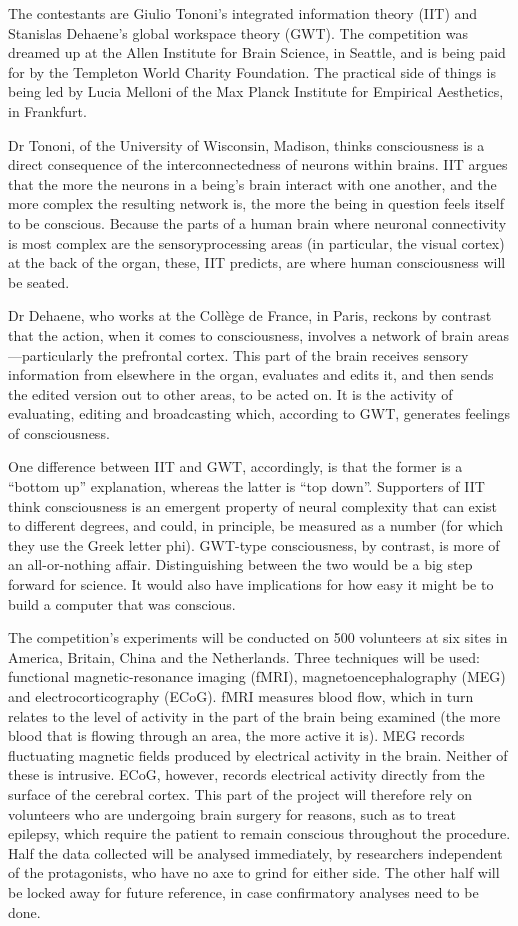 \documentclass[
]{book}
\begin{document}
The contestants are Giulio Tononi's integrated information theory (IIT) and Stanislas Dehaene's global workspace theory (GWT). The competition was dreamed up at the Allen Institute for Brain Science, in Seattle, and is being paid for by the Templeton World Charity Foundation. The practical side of things is being led by Lucia Melloni of the Max Planck Institute for Empirical Aesthetics, in Frankfurt.

Dr Tononi, of the University of Wisconsin, Madison, thinks consciousness is a direct consequence of the interconnectedness of neurons within brains. IIT argues that the more the neurons in a being's brain interact with one another, and the more complex the resulting network is, the more the being in question feels itself to be conscious. Because the parts of a human brain where neuronal connectivity is most complex are the sensoryprocessing areas (in particular, the visual cortex) at the back of the organ, these, IIT predicts, are where human consciousness will be seated.

Dr Dehaene, who works at the Collège de France, in Paris, reckons by contrast that the action, when it comes to consciousness, involves a network of brain areas---particularly the prefrontal cortex. This part of the brain receives sensory information from elsewhere in the organ, evaluates and edits it, and then sends the edited version out to other areas, to be acted on. It is the activity of evaluating, editing and broadcasting which, according to GWT, generates feelings of consciousness.

One difference between IIT and GWT, accordingly, is that the former is a ``bottom up'' explanation, whereas the latter is ``top down''. Supporters of IIT think consciousness is an emergent property of neural complexity that can exist to different degrees, and could, in principle, be measured as a number (for which they use the Greek letter phi). GWT-type consciousness, by contrast, is more of an all-or-nothing affair. Distinguishing between the two would be a big step forward for science. It would also have implications for how easy it might be to build a computer that was conscious.

The competition's experiments will be conducted on 500 volunteers at six sites in America, Britain, China and the Netherlands. Three techniques will be used: functional magnetic-resonance imaging (fMRI), magnetoencephalography (MEG) and electrocorticography (ECoG). fMRI measures blood flow, which in turn relates to the level of activity in the part of the brain being examined (the more blood that is flowing through an area, the more active it is). MEG records fluctuating magnetic fields produced by electrical activity in the brain. Neither of these is intrusive. ECoG, however, records electrical activity directly from the surface of the cerebral cortex. This part of the project will therefore rely on volunteers who are undergoing brain surgery for reasons, such as to treat epilepsy, which require the patient to remain conscious throughout the procedure. Half the data collected will be analysed immediately, by researchers independent of the protagonists, who have no axe to grind for either side. The other half will be locked away for future reference, in case confirmatory analyses need to be done.
\end{document}
